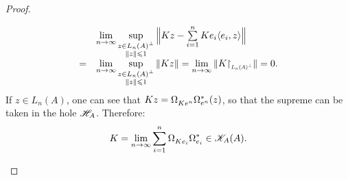 \begin{proposicao}
\begin{proof}
\begin{itemize}
    \begin{equation*}
        \begin{array}{rl}
            & \lim\limits_{n\to \infty} \sup\limits_{\substack{ z \in L_n(A)^{\perp} \\ \|z\| \leq 1}} \Big\| Kz - \sum\limits_{i=1}^n Ke_i \inner{e_i}z\Big\|\\
            = &  
        \lim\limits_{n\to \infty} \sup\limits_{\substack{ z \in L_n(A)^{\perp} \\ \|z\| \leq 1}} \| Kz \| = \lim\limits_{n\to \infty} \|K \sub\restrita{L_n(A)^{\perp}}\|= 0.
        \end{array}
    \end{equation*}
    If $z \in L_n(A)$, one can see that $Kz = \Omega_{Ke^n}^{\vphantom{*}}\Omega_{e^n}^*(z)$, so that the supreme can be taken in the hole $\mathscr H_A$. Therefore:
    \begin{equation*}
        K = \lim_{n\to \infty} \sum_{i=1}^n \Omega_{Ke_i}^{\vphantom{*}}\Omega_{e_i}^* \in \mathscr K_A(A). \qedhere 
    \end{equation*}
\end{itemize}
\end{proof}
\end{proposicao}



